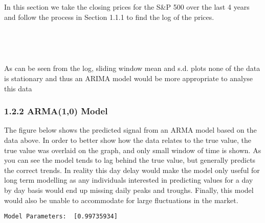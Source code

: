 \documentclass[11pt]{article}
\begin{document}
In this section we take the closing prices for the S\&P 500 over the
last 4 years and follow the process in Section 1.1.1 to find the log of
the prices.

    \begin{center}
    \end{center}
    { \hspace*{\fill} \\}
    
    \begin{center}
    \end{center}
    { \hspace*{\fill} \\}
    
    As can be seen from the log, sliding window mean and s.d. plots none of
the data is stationary and thus an ARIMA model would be more appropriate
to analyse this data

    \hypertarget{arma10-model}{%
\subsubsection{1.2.2 ARMA(1,0) Model}\label{arma10-model}}

The figure below shows the predicted signal from an ARMA model based on
the data above. In order to better show how the data relates to the
true value, the true value was overlaid on the graph, and only small
window of time is shown. As you can see the model tends to lag behind
the true value, but generally predicts the correct trends. In reality
this day delay would make the model only useful for long term modelling
as any individuals interested in predicting values for a day by day
basis would end up missing daily peaks and troughs. Finally, this model
would also be unable to accommodate for large fluctuations in the market.

    \begin{Verbatim}[commandchars=\\\{\}]
Model Parameters:  [0.99735934]
    \end{Verbatim}

    \begin{center}
    \end{center}
    { \hspace*{\fill} \\}
    
\end{document}
